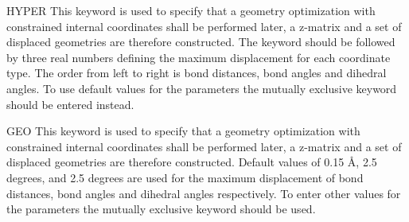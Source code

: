 \begin{keywordlist}

\item[HYPER]
This keyword is used to specify that a geometry optimization with constrained
internal coordinates shall be performed later, a z-matrix and a set of
displaced geometries are therefore constructed. The keyword should be followed by three
real numbers defining the maximum displacement for each coordinate type.
The order from left to right is bond distances, bond angles and dihedral angles.
To use default values for the parameters the mutually exclusive keyword
  should be entered instead.

\item[GEO]
This keyword is used to specify that a geometry optimization with constrained
internal coordinates shall be performed later, a z-matrix and a set of displaced
geometries are therefore constructed. Default values of 0.15 {\AA}, 2.5 degrees,
 and 2.5 degrees are used for the maximum displacement of bond distances, bond
angles and dihedral angles respectively. To enter other values for the parameters
the mutually exclusive keyword  should be used.


\end{keywordlist}
